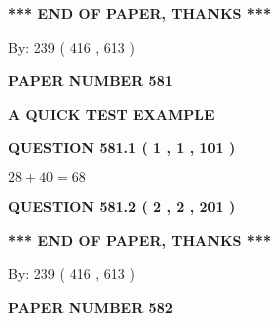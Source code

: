 \documentclass[12pt]{article}
\begin{document}
   
   
\vspace{1.0in} 
{\textbf{\large{ *** END OF PAPER, THANKS *** }}} 
   
   
\hspace{1.0in} By: 
 239 ( 416 ,  613 )
   
   
   
   
\newpage 
\setcounter{page}{ 
   581001 } 
   
   
   
   
 {\textbf{ \Large{ PAPER NUMBER  581  }}}
   
   
\vspace{0.2in}
   
   
   
   
   
   
 \vspace{0.2in}
{\LARGE {\textbf{ A QUICK TEST EXAMPLE}}}
   
   
  
\vspace{0.2in}
  
{\textbf{\Large{QUESTION
581.1 
 ( 1 , 1 , 101 )
}}}
  
  
 
 

$ %
28 +  %
40=   %
68$
 
 
  
\vspace{0.2in}
  
{\textbf{\Large{QUESTION
581.2 
 ( 2 , 2 , 201 )
}}}
  
  
   
   
 \vspace{0.2in}
 
   
   
   
   
\vspace{1.0in} 
{\textbf{\large{ *** END OF PAPER, THANKS *** }}} 
   
   
\hspace{1.0in} By: 
 239 ( 416 ,  613 )
   
   
   
   
\newpage 
\setcounter{page}{ 
   582001 } 
   
   
   
   
 {\textbf{ \Large{ PAPER NUMBER  582  }}}
   
   
\vspace{0.2in}
   
\end{document}
